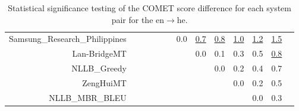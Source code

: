 \documentclass[11pt]{article}
\begin{document}
\begin{sidewaystable}
\begin{center}
{\begin{tabular}{rcccccccccccc}
Samsung\_Research\_Philippines &   &  &  &  &  & \cellcolor{red!0} 0.0 & \cellcolor{red!70} \underline{0.7} & \cellcolor{red!70} \underline{0.8} & \cellcolor{red!70} \underline{1.0} & \cellcolor{red!70} \underline{1.2} & \cellcolor{red!70} \underline{1.5}\\ 
Lan-BridgeMT &  &  &  &  &  &  & \cellcolor{red!0} 0.0 & \cellcolor{red!0} 0.1 & \cellcolor{red!0} 0.3 & \cellcolor{red!60} 0.5 & \cellcolor{red!70} \underline{0.8}\\ 
NLLB\_Greedy &  &   &  &  &  &  &  & \cellcolor{red!0} 0.0 & \cellcolor{red!0} 0.2 & \cellcolor{red!60} 0.4 & \cellcolor{red!70} 0.7\\ 
ZengHuiMT &  &  &    &  &  &  &  &  & \cellcolor{red!0} 0.0 & \cellcolor{red!0} 0.2 & \cellcolor{red!40} 0.5\\ 
NLLB\_MBR\_BLEU &    &  &  &  &  &  &  &  &  & \cellcolor{red!0} 0.0 & \cellcolor{red!0} 0.3\\ 
\bottomrule 
\end{tabular} }
\caption{Statistical significance testing of the COMET score difference for each system pair for the en$\rightarrow$he.} 
 \end{center} \end{sidewaystable} 
\end{document}
